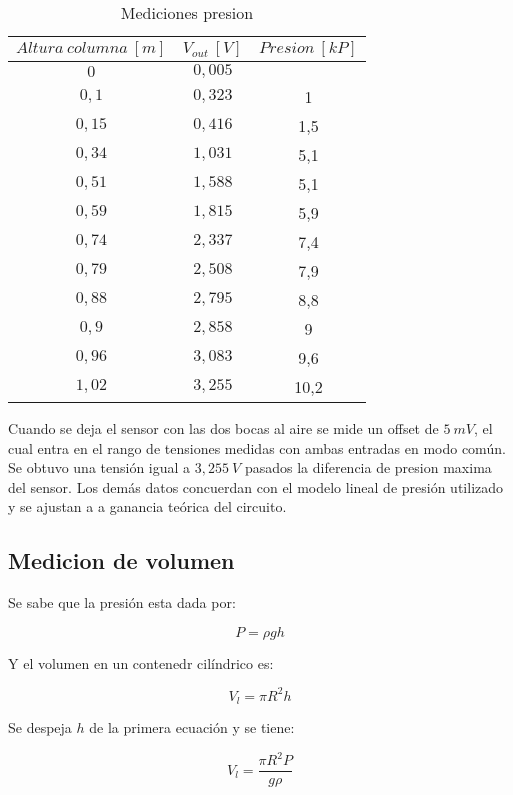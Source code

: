 \begin{table}[H]
\centering
\begin{tabular}{ccc}\hline
$Altura \ columna \ [m]$ & $V_{out} \ [V]$ & $Presion \ [kP]$ \\
\hline
$0$   & $0,005$ &   \\
$0,1$  & $0,323$ & 1 \\
$0,15$  & $0,416$ & 1,5 \\
$0,34$  & $1,031$ & 5,1 \\
$0,51$  & $1,588$ & 5,1\\
$0,59$  & $1,815$ & 5,9\\
$0,74$  & $2,337$ & 7,4\\
$0,79$  & $2,508$ & 7,9\\
$0,88$  & $2,795$ & 8,8\\
$0,9$  & $2,858$ & 9\\
$0,96$  & $3,083$ & 9,6\\
$1,02$  & $3,255$ & 10,2\\ \hline
\end{tabular}
\caption{Mediciones presion}
\label{table:presion}
\end{table}

Cuando se deja el sensor con las dos bocas al aire se mide un offset de $5 \ mV$, el cual entra en el rango de tensiones medidas con ambas entradas en modo común. Se obtuvo una tensión igual a $3,255 \ V$ pasados la diferencia de presion maxima del sensor. Los dem\'as datos concuerdan con el modelo lineal de presi\'on utilizado y se ajustan a a ganancia te\'orica del circuito.

\subsection{Medicion de volumen}

Se sabe que la presión esta dada por:

\begin{equation}
P = \rho gh 
\end{equation}

Y el volumen en un contenedr cil\'indrico es:
 
\begin{equation}
V_l = \pi R^2h 
\end{equation}

Se despeja $h$ de la primera ecuaci\'on y se tiene:

\begin{equation}\label{eq:volumen}
V_l = \frac{\pi R^2P}{g\rho}
\end{equation} 

